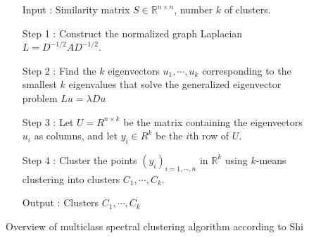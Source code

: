 \begin{figure}[ht]
\label{fig:spectralclustering}
\begin{mdframed}
\begin{enumerate}
\item[Input] : Similarity matrix $S \in \mathbb{R}^{n \times n}$, number $k$ of clusters. 
\item[Step 1] : Construct the normalized graph Laplacian $L = D^{-1/2} A D^{-1/2}$.
\item[Step 2] : Find the $k$ eigenvectors $u_1, \cdots, u_k$ corresponding to the smallest $k$ eigenvalues that solve the generalized eigenvector problem $L u = \lambda D u$ 
\item[Step 3] : Let $U = R^{n \times k}$ be the matrix containing the eigenvectors $u_i$ as columns, and let $y_i \in R^k$ be the $i$th row of $U$.
\item[Step 4] : Cluster the points $(y_i)_{i=1,\cdots,n}$ in $\mathbb{R}^k$ using $k$-means clustering into clusters $C_1,\cdots,C_k$.
\item[Output] : Clusters $C_1, \cdots, C_k$
\end{enumerate}
\end{mdframed}
\caption{Overview of multiclass spectral clustering algorithm according to Shi}
\end{figure}

